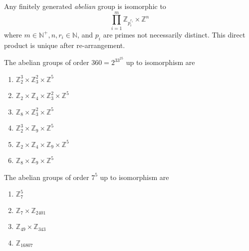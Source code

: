 \begin{theorem}
Any finitely generated \emph{abelian} group is isomorphic to
\[
\prod_{i=1}^m\mathbb{Z}_{p_i^{r_i}}\times\mathbb{Z}^n
\]
where $m\in\mathbb{N}^+,n,r_i\in\mathbb{N}$, and $p_i$ are primes not necessarily distinct. This direct product is unique after re-arrangement.
\end{theorem}
\begin{example}
The abelian groups of order $360=2^33^25$ up to isomorphism are
\begin{enumerate}
\item
$\mathbb{Z}_2^3\times\mathbb{Z}_3^2\times\mathbb{Z}^5$
\item
$\mathbb{Z}_2\times\mathbb{Z}_{4}\times\mathbb{Z}_3^2\times\mathbb{Z}^5$
\item
$\mathbb{Z}_8\times\mathbb{Z}_3^2\times\mathbb{Z}^5$
\item
$\mathbb{Z}_2^3\times\mathbb{Z}_9\times\mathbb{Z}^5$
\item
$\mathbb{Z}_2\times\mathbb{Z}_{4}\times\mathbb{Z}_9\times\mathbb{Z}^5$
\item
$\mathbb{Z}_8\times\mathbb{Z}_9\times\mathbb{Z}^5$
\
\end{enumerate}
The abelian groups of order $7^5$ up to isomorphism are
\begin{enumerate}
\item
$\mathbb{Z}_7^5$
\item
$\mathbb{Z}_7\times \mathbb{Z}_{2401}$
\item
$\mathbb{Z}_{49}\times \mathbb{Z}_{343}$
\item
$\mathbb{Z}_{16807}$
\end{enumerate}
\end{example}









